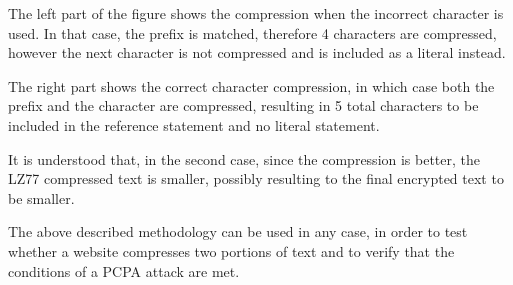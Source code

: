 The left part of the figure shows the compression when the incorrect character
is used. In that case, the prefix is matched, therefore 4 characters are
compressed, however the next character is not compressed and is included as a
literal instead.

The right part shows the correct character compression, in which case both the
prefix and the character are compressed, resulting in 5 total characters to be
included in the reference statement and no literal statement.

It is understood that, in the second case, since the compression is better, the
LZ77 compressed text is smaller, possibly resulting to the final encrypted text
to be smaller.

The above described methodology can be used in any case, in order to test
whether a website compresses two portions of text and to verify that the
conditions of a PCPA attack are met.
